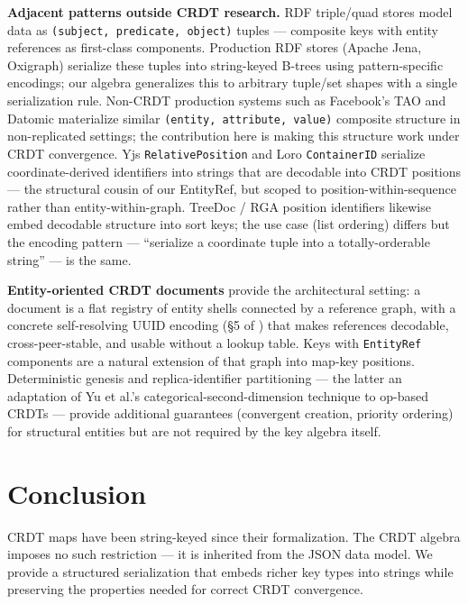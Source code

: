 \textbf{Adjacent patterns outside CRDT research.} RDF triple/quad stores \cite{w3c:rdf11} model data as \texttt{(subject, predicate, object)} tuples --- composite keys with entity references as first-class components. Production RDF stores (Apache Jena, Oxigraph) serialize these tuples into string-keyed B-trees using pattern-specific encodings; our algebra generalizes this to arbitrary tuple/set shapes with a single serialization rule. Non-CRDT production systems such as Facebook's TAO and Datomic materialize similar \texttt{(entity, attribute, value)} composite structure in non-replicated settings; the contribution here is making this structure work under CRDT convergence. Yjs \texttt{RelativePosition} \cite{yjs:relativeposition} and Loro \texttt{ContainerID} serialize coordinate-derived identifiers into strings that are decodable into CRDT positions --- the structural cousin of our EntityRef, but scoped to position-within-sequence rather than entity-within-graph. TreeDoc / RGA position identifiers \cite{treedoc2009} likewise embed decodable structure into sort keys; the use case (list ordering) differs but the encoding pattern --- ``serialize a coordinate tuple into a totally-orderable string'' --- is the same.

\textbf{Entity-oriented CRDT documents} \cite{plexus:arch} provide the architectural setting: a document is a flat registry of entity shells connected by a reference graph, with a concrete self-resolving UUID encoding (\S 5 of \cite{plexus:arch}) that makes references decodable, cross-peer-stable, and usable without a lookup table. Keys with \texttt{EntityRef} components are a natural extension of that graph into map-key positions. Deterministic genesis \cite{plexus:genesis} and replica-identifier partitioning \cite{plexus:partitioning} --- the latter an adaptation of Yu et al.'s categorical-second-dimension technique to op-based CRDTs --- provide additional guarantees (convergent creation, priority ordering) for structural entities but are not required by the key algebra itself.

\section{Conclusion}

CRDT maps have been string-keyed since their formalization. The CRDT algebra imposes no such restriction --- it is inherited from the JSON data model. We provide a structured serialization that embeds richer key types into strings while preserving the properties needed for correct CRDT convergence.

